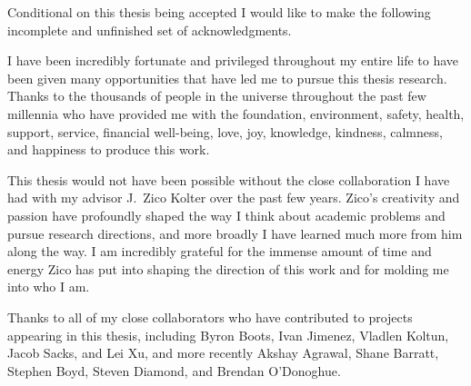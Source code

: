 \documentclass[12pt]{cmuthesis}
\begin{document}
\begin{acknowledgments}
  Conditional on this thesis being accepted I would like to
  make the following incomplete and unfinished
  set of acknowledgments. \vspace{6mm}

  I have been incredibly fortunate and privileged throughout
  my entire life to have been given many opportunities
  that have led me to pursue this thesis research.
  Thanks to the thousands of people in the universe throughout
  the past few millennia who have provided me with the
  foundation, environment, safety, health, support, service,
  financial well-being, love, joy, knowledge, kindness, calmness,
  and happiness to produce this work.

  This thesis would not have been possible without the close
  collaboration I have had with my advisor J.~Zico Kolter over
  the past few years.
  Zico's creativity and passion have profoundly shaped
  the way I think about academic problems and pursue
  research directions, and more broadly I have learned much
  more from him along the way.
  I am incredibly grateful for the immense
  amount of time and energy Zico has put into shaping the
  direction of this work and for molding me into who I am.

  Thanks to all of my close collaborators who have contributed
  to projects appearing in this thesis, including
  Byron Boots, Ivan Jimenez, Vladlen Koltun, Jacob Sacks, and Lei Xu,
  and more recently
  Akshay Agrawal,
  Shane Barratt,
  Stephen Boyd,
  Steven Diamond,
  and Brendan O'Donoghue.


\end{acknowledgments}
\end{document}
